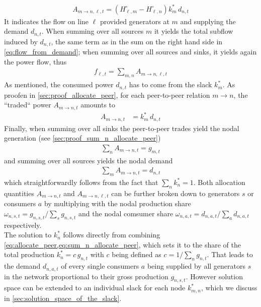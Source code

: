\documentclass[11pt,twocolumn]{article}
\newcommand{\generation}[1][n]{g_{#1,s,t}}
\newcommand{\generationshare}[1][n]{\omega_{#1,s,t}}
\newcommand{\nodalgeneration}[1][n]{g_{#1,t}}
\newcommand{\demand}[1][n]{d_{#1,a,t}}
\newcommand{\nodaldemand}[1][n]{d_{#1,t}}
\newcommand{\demandshare}[1][n]{\omega_{#1,a,t}}
\newcommand{\ptdf}[1][n]{H_{\ell,#1}}
\newcommand{\ptdfEqual}[1][n]{\ptdf[#1]^\circ}
\newcommand{\slackk}[1][n]{k^*_{#1}}
\newcommand{\Slackk}{k^*_{m,n}}
\newcommand{\flow}{f_{\ell,t}}
\newcommand{\allocatePeer}[1][m \rightarrow n]{A_{#1,t}}
\newcommand{\allocateTransaction}[1][m \rightarrow n]{A_{#1,\ell,t}}
\begin{document}
\begin{align}
 \allocateTransaction = \left(  \ptdfEqual[m] - \ptdfEqual \right) \slackk[m] \, \nodaldemand
 \label{eq:allocate_transaction}
\end{align}
% 
It indicates the flow on line $\ell$ provided generators at $m$ and supplying the demand $\nodaldemand$. When summing over all sources $m$ it yields the total subflow induced by $\nodaldemand$, the same term as in the sum on the right hand side in \cref{eq:flow_from_demand}; 
when summing over all sources and sinks, it yields again the power flow, thus
\begin{align}
\flow = \sum_{m,n} \allocateTransaction
\label{eq:transaction_sum}
\end{align}
% 
As mentioned, the consumed power $\nodaldemand$ has to come from the slack $\slackk[m]$. As proofen in \cref{sec:proof_allocate_peer}, for each peer-to-peer relation $m \rightarrow n$, the ``traded`` power $\allocatePeer$  amounts to
\begin{align}
 \allocatePeer &= \slackk[m] \, \nodaldemand 
\label{eq:allocate_peer}
\end{align}
% 
Finally, when summing over all sinks the peer-to-peer trades yield the nodal generation (see \cref{sec:proof_sum_n_allocate_peer}) 
\begin{align}
 \sum_n \allocatePeer = \nodalgeneration[m]
 \label{eq:sum_n_allocate_peer}
\end{align}
and summing over all sources yields the nodal demand 
\begin{align}
 \sum_m \allocatePeer = \nodaldemand
 \label{eq:sum_m_allocate_peer}
\end{align}
which straightforwardly follows from the fact that $\sum_n \slackk = 1$.
Both allocation quantities $\allocatePeer$ and $\allocateTransaction$ can be further broken down to generators $s$ or consumers $a$ by multiplying with the nodal production share $\generationshare = \generation/\sum_s \generation$ and the nodal comsumer share $\demandshare = \demand/\sum_a \demand$ respectively. \\


The solution to $\slackk$ follows directly from combining \cref{eq:allocate_peer,eq:sum_n_allocate_peer}, which sets it to the share of the total production $\slackk = c \, \nodalgeneration$ with $c$ being defined as $c = 1/\sum_n \nodalgeneration$. That leads to the demand $\demand$ of every single consumers $a$ being supplied by all generators $s$ in the network proportional to their gross production $\generation$. However solution space can be extended to an individual slack for each node $\Slackk$, which we discuss in \cref{sec:solution_space_of_the_slack}.
\end{document}
